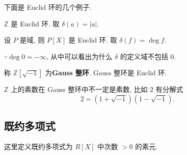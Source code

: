 \documentclass[UTF8]{ctexart}
\begin{document}
下面是 Euclid 环的几个例子.
\begin{example}
    $\mathbb{Z}$ 是 Euclid 环. 取 $\delta(a)=|a|$.
\end{example}
\begin{example}
    设 $P$ 是域, 则 $P[X]$ 是 Euclid 环. 取 $\delta(f)=\deg f$.

    $\because\deg 0=-\infty$, 从中可以看出为什么 $\delta$ 的定义域不包括 $0$.
\end{example}
\begin{example}
    称 $\mathbb{Z}[\sqrt{-1}]$ 为\textbf{Gauss 整环}. Gauss 整环是 Euclid 环.

    $\mathbb{Z}$ 上的素数在 Gauss 整环中不一定是素数, 比如 $2$ 有分解式
    \[2=(1+\sqrt{-1})(1-\sqrt{-1}).\]
\end{example}
\subsection{既约多项式}
这里定义既约多项式为 $R[X]$ 中次数 $>0$ 的素元.
\end{document}
